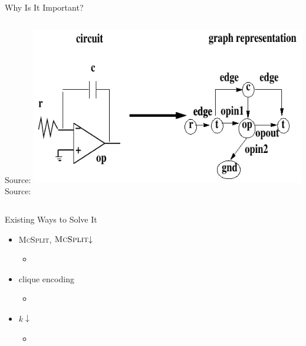 \documentclass{beamer}
\begin{document}
\begin{frame}{Why Is It Important?}
\begin{columns}[t]
\begin{column}{0.5\textwidth}
      {\tiny Source: \cite{grindley}}
      \includegraphics[width=0.9\textwidth,height=0.4\textheight,keepaspectratio]{electronics2.png} \\[-7pt]
      {\tiny Source: \cite{617051}}
    \end{column}
  \end{columns}
\end{frame}

\begin{frame}{Existing Ways to Solve It}
  \begin{itemize}
  \item \textsc{McSplit}, $\textsc{McSplit}{\downarrow}$
    \begin{itemize}
    \item \cite{DBLP:conf/ijcai/McCreeshPT17}
    \end{itemize}
  \item clique encoding
    \begin{itemize}
    \item \cite{DBLP:conf/cp/McCreeshNPS16}
    \end{itemize}
  \item $k{\downarrow}$
    \begin{itemize}
    \item \cite{DBLP:conf/aaai/HoffmannMR17}
    \end{itemize}
  \end{itemize}
\end{frame}
\end{document}
